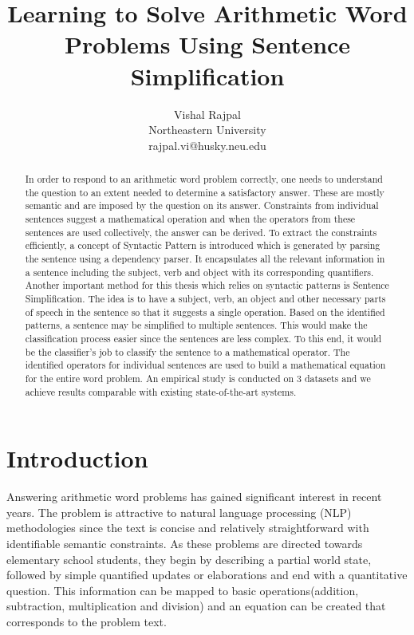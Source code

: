 \documentclass[11pt]{article}
\begin{document}
\nocite{Murphy, Wasserman, Hastie}

\title{Learning to Solve Arithmetic Word Problems Using Sentence Simplification}
\author{
	Vishal Rajpal\\
	Northeastern University\\
	rajpal.vi@husky.neu.edu\\
}
\date{}
\maketitle

\begin{abstract}
In order to respond to an arithmetic word problem correctly, one needs to understand the question to an extent needed to determine a satisfactory answer. These are mostly semantic and are imposed by the question on its answer. Constraints from individual sentences suggest a mathematical operation and when the operators from these sentences are used collectively, the answer can be derived. To extract the constraints efficiently, a concept of Syntactic Pattern is introduced which is generated by parsing the sentence using a dependency parser. It encapsulates all the relevant information in a sentence including the subject, verb and object with its corresponding quantifiers. Another important method for this thesis which relies on syntactic patterns is Sentence Simplification. The idea is to have a subject, verb, an object and other necessary parts of speech in the sentence so that it suggests a single operation. Based on the identified patterns, a sentence may be simplified to multiple sentences. This would make the classification process easier since the sentences are less complex. To this end, it would be the classifier's job to classify the sentence to a mathematical operator. The identified operators for individual sentences are used to build a mathematical equation for the entire word problem. An empirical study is conducted on 3 datasets and we achieve results comparable with existing state-of-the-art systems.
\end{abstract}

\section{Introduction} \label{sec:introduction}
Answering arithmetic word problems has gained significant interest in recent years. The problem is attractive to natural language processing (NLP) methodologies  since the text is concise and relatively straightforward with identifiable semantic constraints. As these problems are directed towards elementary school students, they begin by describing a partial world state, followed by simple quantified updates or elaborations and end with a quantitative question. This information can be mapped to basic operations(addition, subtraction, multiplication and division) and an equation can be created that corresponds to the problem text. 
\end{document}
